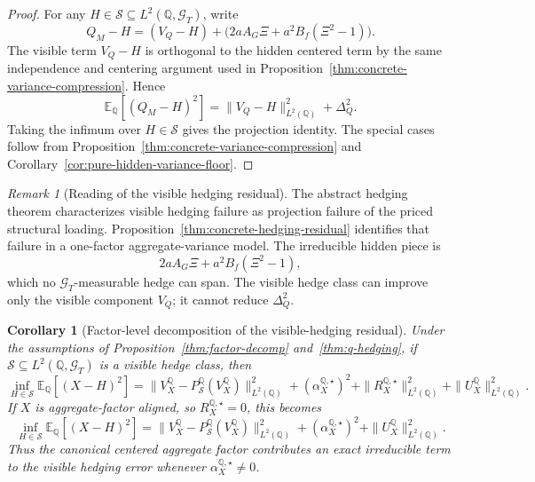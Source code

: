 \documentclass[11pt,a4paper]{amsart}
\theoremstyle{plain}
\newtheorem{corollary}[theorem]{Corollary}
\theoremstyle{definition}
\theoremstyle{remark}
\newtheorem{remark}[theorem]{Remark}
\newcommand{\QQ}{\mathbb{Q}}
\newcommand{\EE}{\mathbb{E}}
\newcommand{\cG}{\mathcal{G}}
\newcommand{\cS}{\mathcal{S}}
\begin{document}
\begin{proof}
For any \(H\in\cS\subseteq L^2(\QQ,\cG_T)\), write
\[
        Q_M-H=(V_Q-H)+\bigl(2aA_G\Xi+a^2B_f(\Xi^2-1)\bigr).
\]
The visible term \(V_Q-H\) is orthogonal to the hidden centered term by the same independence and
centering argument used in Proposition~\ref{thm:concrete-variance-compression}.  Hence
\[
        \EE_\QQ[(Q_M-H)^2]
        =
        \|V_Q-H\|_{L^2(\QQ)}^2+
        \Delta_Q^2.
\]
Taking the infimum over \(H\in\cS\) gives the projection identity.  The special cases follow from
Proposition~\ref{thm:concrete-variance-compression} and Corollary~\ref{cor:pure-hidden-variance-floor}.
\end{proof}

\begin{remark}[Reading of the visible hedging residual]\label{rem:concrete-hedging-residual}
The abstract hedging theorem characterizes visible hedging failure as projection failure of the
priced structural loading.  Proposition~\ref{thm:concrete-hedging-residual} identifies that failure in
a one-factor aggregate-variance model.  The irreducible hidden piece is
\[
        2aA_G\Xi+a^2B_f(\Xi^2-1),
\]
which no \(\cG_T\)-measurable hedge can span.  The visible hedge class can improve only the visible
component \(V_Q\); it cannot reduce \(\Delta_Q^2\).
\end{remark}

\begin{corollary}[Factor-level decomposition of the visible-hedging residual]\label{cor:q-hedging-factor}
Under the assumptions of Proposition~\ref{thm:factor-decomp} and~\ref{thm:q-hedging}, if
\(\cS\subseteq L^2(\QQ,\cG_T)\) is a visible hedge class, then
\[
        \inf_{H\in \cS}\EE_\QQ[(X-H)^2]
        =
        \|V_X^\QQ-P_{\cS}^\QQ(V_X^\QQ)\|_{L^2(\QQ)}^2
        +
        (\alpha_X^{\QQ,\star})^2
        +
        \|R_X^{\QQ,\star}\|_{L^2(\QQ)}^2
        +
        \|U_X^\QQ\|_{L^2(\QQ)}^2.
\]
If \(X\) is aggregate-factor aligned, so \(R_X^{\QQ,\star}=0\), this becomes
\[
        \inf_{H\in \cS}\EE_\QQ[(X-H)^2]
        =
        \|V_X^\QQ-P_{\cS}^\QQ(V_X^\QQ)\|_{L^2(\QQ)}^2
        +
        (\alpha_X^{\QQ,\star})^2
        +
        \|U_X^\QQ\|_{L^2(\QQ)}^2.
\]
Thus the canonical centered aggregate factor contributes an exact irreducible term to the visible
hedging error whenever \(\alpha_X^{\QQ,\star}\neq0\).
\end{corollary}
\end{document}
